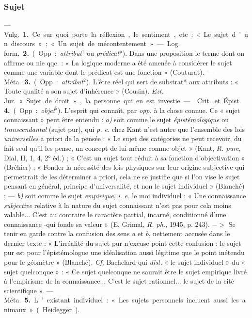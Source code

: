 \subsubsection{Sujet}
 —  \si{Vulg.} {\bf 1.} Ce sur quoi porte la
réflexion, le sentiment, etc. : « Le sujet d’un discours »; « Un sujet de
mécontentement ». — \si{Log. form.}  {\bf 2.} (Opp. : {\it attribut}$^1$ ou
{\it prédicat}*). Dans une proposition le terme dont on affirme ou nie
qqc. : « La logique moderne a été amenée à considérer le sujet comme une
variable dont le prédicat est une fonction » (Couturat). — \si{Méta.}
{\bf 3.} (Opp. : {\it attribut}$^2$). L'être réel qui sert de substrat* aux
attributs : « Toute qualité a son sujet d’inhérence » (Cousin). {\it Ext.}
\si{Jur.} « Sujet de droit », la personne qui en est investie.

—  \si{Crit.} et \si{Épist.} {\bf 4.} (Opp. :
{\it objet}$^5$). L'esprit qui connaît, par {\it opp.} à la chose connue. Ce
« sujet connaissant » peut être entendu : {\it a)} soit comme le sujet {\it
épistémologique} ou {\it transcendantal} (sujet pur), qui {\it p. e.} chez
Kant n’est autre que l’ensemble des lois {\it universelles} a priori de la
pensée : « Le sujet des catégories ne peut recevoir, du fait seul qu'il les
pense, un concept de lui-même comme objet » (Kant, {\it R. pure}, Dial, II,
1, 4, 2° éd.) ; « C’est un sujet tout réduit à sa fonction d’objectivation
» (Bréhier) ; « Fonder la nécessité des lois physiques sur leur origine
subjective qui permettrait de les déterminer a priori, cela ne se justifie
que si l'on vise le sujet pensant en général, principe d'universalité, et
non le sujet individuel » (Blanché) ; — {\it b)} soit comme le sujet {\it
empirique}, {\it i. e.} le moi individuel : « Une connaissance {\it
subjective} relative à la nature du sujet connaissant n’est pas pour cela
moins valable... C'est au contraire le caractère partial, incarné,
conditionné d’une connaissance -qui fonde sa valeur » (E. Grimal, {\it R.
ph.}, 1945, p. 243). $->$ Se
tenir en garde contre la confusion des sens {\it a} et {\it b}, nettement
accusée dans le dernier texte : « L’irréalité du sujet pur n’excuse point
cette confusion : le sujet pur est pour l’épistémologue une idéalisation
aussi légitime que le point inétendu pour le géomètre » (Blanché). {\it Cf.}
Bachelard qui {\it dist.} « le sujet individuel » du « sujet quelconque » :
« Ce sujet quelconque ne saurait être le sujet empirique livré à l’empirisme
de la connaissance... C'est le sujet rationnel... le sujet de la cité
scientifique ». — \si{Méta.} {\bf 5.} L’existant individuel : « Les sujets
personnels incluent aussi les animaux » (Heidegger).

